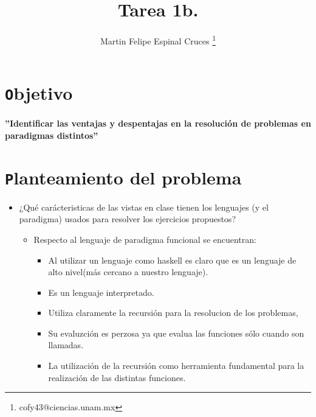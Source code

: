\documentclass[10pt]{article}
\author{Martin Felipe Espinal Cruces \footnote{cofy43@ciencias.unam.mx}	}
\title{Tarea 1b.}
\begin{document}
\begin{titlepage}
	
	\maketitle
	
	\vspace{.5in}

	\begin{flushleft}
		\section{\texttt Objetivo}
		\paragraph{''Identificar las ventajas y despentajas en la resolución de problemas en paradigmas distintos''}

		\section{\texttt Planteamiento del problema}
		\begin{itemize}
			\item ¿Qué carácteristicas de las vistas en clase tienen los lenguajes (y el paradigma) 		  usados para resolver los ejercicios propuestos?
			
			\begin{itemize}
				\item Respecto al lenguaje de paradigma funcional se encuentran:
			
				\begin{itemize}
					\item Al utilizar un lenguaje como haskell es claro que es un lenguaje de alto nivel(más cercano a nuestro lenguaje).
					\item Es un lenguaje interpretado.
					\item Utiliza claramente la recursión para la resolucion de los problemas,
					\item Su evaluzción es perzosa ya que evalua las funciones sólo cuando son llamadas.
					\item La utilización de la recursión como herramienta fundamental para la realización de las distintas funciones.
				\end{itemize}
		

\end{itemize}
\end{itemize}
\end{flushleft}
\end{titlepage}
\end{document}
